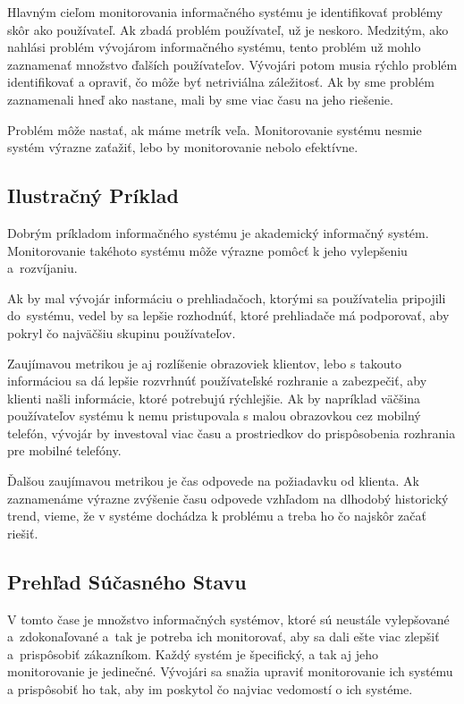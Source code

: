 \documentclass[a4paper, usesections, upjsfrontpage, thesismargins, thesislinespacing, twoside]{rnthesissvk}
\begin{document}
Hlavným cieľom monitorovania informačného systému je identifikovať problémy skôr ako používateľ.
Ak zbadá problém používateľ, už je neskoro.
Medzitým, ako nahlási problém vývojárom informačného systému, tento problém už mohlo zaznamenať množstvo ďalších používateľov.
Vývojári potom musia rýchlo problém identifikovať a opraviť, čo môže byť netriviálna záležitosť.
Ak by sme problém zaznamenali hneď ako nastane, mali by sme viac času na jeho riešenie.

Problém môže nastať, ak máme metrík veľa.
Monitorovanie systému nesmie systém výrazne zaťažiť, lebo by monitorovanie nebolo efektívne.

\subsection{Ilustračný Príklad}

Dobrým príkladom informačného systému je akademický informačný systém.
Monitorovanie takéhoto systému môže výrazne pomôcť k jeho vylepšeniu a~rozví\-janiu.

Ak by mal vývojár informáciu o prehliadačoch, ktorými sa používatelia pripojili do~systému, vedel by sa lepšie rozhodnúť, ktoré prehliadače má podporovať, aby pokryl čo najväčšiu skupinu používateľov.

Zaujímavou metrikou je aj rozlíšenie obrazoviek klientov, lebo s takouto informáciou sa dá lepšie rozvrhnúť používateľské rozhranie a zabezpečiť, aby klienti našli informácie, ktoré potrebujú rýchlejšie.
Ak by napríklad väčšina používateľov systému k nemu pristupovala s malou obrazovkou cez mobilný telefón, vývojár by investoval viac času a prostriedkov do prispôsobenia rozhrania pre mobilné telefóny.

Ďalšou zaujímavou metrikou je čas odpovede na požiadavku od klienta.
Ak zaznamenáme výrazne zvýšenie času odpovede vzhľadom na dlhodobý historický trend, vieme, že v systéme dochádza k problému a treba ho čo najskôr začať riešiť.

\subsection{Prehľad Súčasného Stavu}
 
V tomto čase je množstvo informačných systémov, ktoré sú neustále vylepšované a~zdokonaľované a~tak je potreba ich monitorovať, aby sa dali ešte viac zlepšiť a~prispôsobiť zákazníkom.
Každý systém je špecifický, a tak aj jeho monitorovanie je jedinečné.
Vývojári sa snažia upraviť monitorovanie ich systému a prispôsobiť ho tak, aby im poskytol čo najviac vedomostí o ich systéme.
\end{document}

